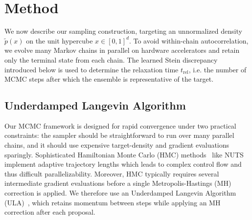 \documentclass[11pt]{article}
\begin{document}
\section{Method}

We now describe our sampling construction, targeting an unnormalized density $\widetilde{p}(x)$ on the unit hypercube $x\in[0,1]^d$.
To avoid within-chain autocorrelation, we evolve many Markov chains in parallel on hardware accelerators and retain only the terminal state from each chain.
The learned Stein discrepancy introduced below is used to determine the relaxation time $t_{\mathrm{rel}}$, i.e. the number of MCMC steps after which the ensemble is representative of the target.

\subsection{Underdamped Langevin Algorithm}
Our MCMC framework is designed for rapid convergence under two practical constraints: the sampler should be straightforward to run over many parallel chains, and it should use expensive target-density and gradient evaluations sparingly.
Sophisticated Hamiltonian Monte Carlo (HMC) methods~\cite{neal2011mcmc} like NUTS~\cite{hoffman2014no} implement adaptive trajectory lengths which leads to complex control flow and thus difficult parallelizability.
Moreover, HMC typically requires several intermediate gradient evaluations before a single Metropolis-Hastings (MH) correction is applied.
We therefore use an Underdamped Langevin Algorithm (ULA)~\cite{roberts1996exponential,cheng2018underdamped}, which retains momentum between steps while applying an MH correction after each proposal.
\end{document}
